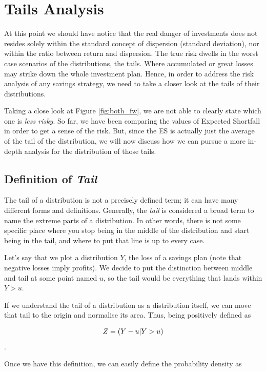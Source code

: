 \section{Tails Analysis}

At this point we should have notice that the real danger of investments does not resides solely within the standard concept of dispersion (standard deviation), nor within the ratio between return and dispersion. The true risk dwells in the worst case scenarios of the distributions, the tails. Where accumulated or great losses may strike down the whole investment plan. Hence, in order to address the risk analysis of any savings strategy, we need to take a closer look at the tails of their distributions. 

Taking a close look at Figure \ref{fig:both_fw}, we are not able to clearly state which one is \textit{less risky}. So far, we have been comparing the values of Expected Shortfall in order to get a sense of the risk. But, since the ES is actually just the average of the tail of the distribution, we will now discuss how we can pursue a more in-depth analysis for the distribution of those tails.

\subsection{Definition of \textit{Tail}}

The tail of a distribution is not a precisely defined term; it can have many different forms and definitions. Generally, the \textit{tail} is considered a broad term to name the extreme parts of a distribution. In other words, there is not some specific place where you stop being in the middle of the distribution and start being in the tail, and where to put that line is up to every case.

Let's say that we plot a distribution $Y$, the loss of a savings plan (note that negative losses imply profits). We decide to put the distinction between middle and tail at some point named $u$, so the tail would be everything that lands within $Y>u$.

If we understand the tail of a distribution as a distribution itself, we can move that tail to the origin and normalise its area. Thus, being positively defined as

\begin{align}
    Z = \qty(Y-u | Y>u)
\end{align}.

Once we have this definition, we can easily define the probability density as

